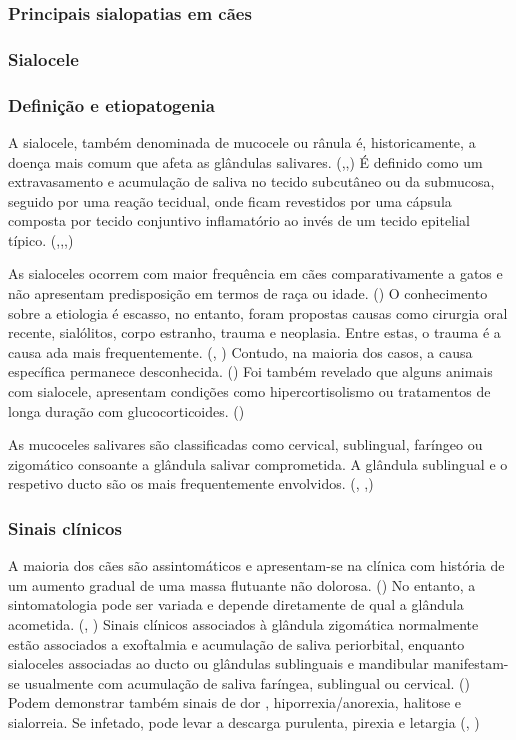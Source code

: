 \subsubsection{Principais sialopatias em cães}
\subsubsection{Sialocele}
\subsubsection{Definição e etiopatogenia}

A sialocele, também denominada de mucocele ou rânula é, historicamente, a doença  mais comum que afeta as glândulas salivares. (\cite{de2020},\cite{Cinti2021},\cite{Olimpo2023}) É definido como um extravasamento e acumulação de saliva no tecido subcutâneo ou da submucosa, seguido por uma reação tecidual, onde ficam revestidos por uma cápsula composta por tecido conjuntivo inflamatório ao invés de um tecido epitelial típico. (\cite{vetrecord},\cite{rfeu},\cite{animals},\cite{sa_})


As sialoceles ocorrem com maior frequência em cães comparativamente a gatos e não apresentam predisposição em termos de raça ou idade. (\cite{animals}) O conhecimento sobre a etiologia é escasso, no entanto, foram propostas causas como cirurgia oral recente, sialólitos, corpo estranho, trauma e neoplasia. Entre estas, o trauma é a causa \cite{Kumar2017}ada mais frequentemente. (\cite{de2020}, \cite{Olimpo2023}) Contudo, na maioria dos casos, a causa específica permanece desconhecida. ({\cite{Cinti2021}}) Foi também revelado que alguns animais com sialocele, apresentam condições como hipercortisolismo ou tratamentos de longa duração com glucocorticoides. (\cite{animals}) 


As mucoceles salivares são classificadas como cervical, sublingual, faríngeo ou zigomático consoante a glândula salivar comprometida. A glândula sublingual e o respetivo ducto são os mais frequentemente envolvidos. (\cite{Poirier2018}, \cite{Cinti2021},\cite{sa_})

\subsubsection{Sinais clínicos}

A maioria dos cães são assintomáticos e apresentam-se na clínica com história de um aumento gradual de uma massa flutuante não dolorosa. (\cite{Poirier2018}) No entanto, a sintomatologia pode ser variada e depende diretamente de qual a glândula acometida. (\cite{de2020}, \cite{sa_}) Sinais clínicos associados à glândula zigomática normalmente estão associados a exoftalmia e acumulação de saliva periorbital, enquanto sialoceles associadas  ao ducto ou glândulas sublinguais e mandibular manifestam-se usualmente com acumulação de saliva faríngea, sublingual ou cervical. (\cite{sa_}) Podem demonstrar também sinais de dor , hiporrexia/anorexia, halitose e sialorreia.  Se infetado, pode levar a descarga purulenta, pirexia e letargia (\cite{sa_}, \cite{Swieton2022})

